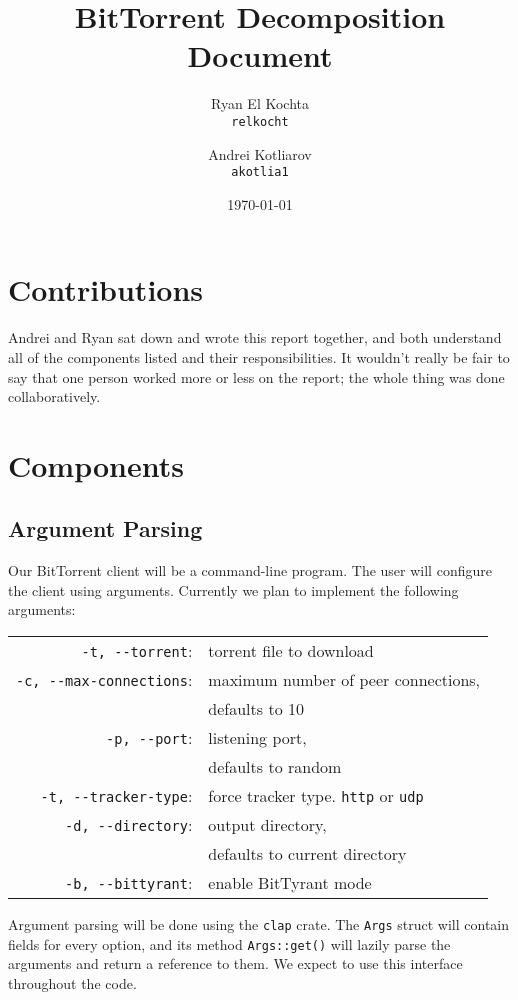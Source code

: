 \documentclass{article}
\title{BitTorrent Decomposition Document}
\author{Ryan El Kochta\\
        \texttt{relkocht}
        \and
        Andrei Kotliarov\\
        \texttt{akotlia1}
        }
\date{\today}
\begin{document}
    \maketitle
    \tableofcontents

    \clearpage
    \section{Contributions}

    Andrei and Ryan sat down and wrote this report together, and both understand all of the components listed and their responsibilities.
    It wouldn't really be fair to say that one person worked more or less on the report; the whole thing was done collaboratively.

    \section{Components}

    \subsection{Argument Parsing}

    Our BitTorrent client will be a command-line program.
    The user will configure the client using arguments.
    Currently we plan to implement the following arguments:
    \begin{center}
    \begin{tabular}{r l}
        \verb|-t, --torrent|:&         torrent file to download \\
        \verb|-c, --max-connections|:& maximum number of peer connections, \\
        & defaults to 10 \\
        \verb|-p, --port|:&            listening port, \\
        & defaults to random \\
        \verb|-t, --tracker-type|:&    force tracker type. \verb|http| or \verb|udp| \\
        \verb|-d, --directory|:&       output directory, \\
        & defaults to current directory \\
        \verb|-b, --bittyrant|:&       enable BitTyrant mode
    \end{tabular}
    \end{center}
    Argument parsing will be done using the \verb|clap| crate.
    The \verb|Args| struct will contain fields for every option, and its method \verb|Args::get()| will lazily parse the arguments and return a reference to them.
    We expect to use this interface throughout the code.
\end{document}
